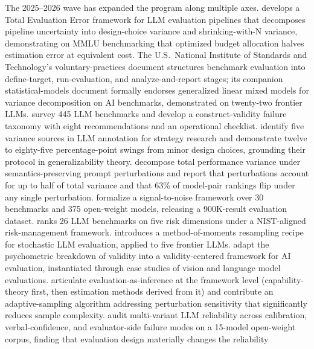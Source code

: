 \documentclass[10pt]{article}
\begin{document}
The 2025--2026 wave has expanded the program along multiple axes.
\citet{messing2026hidden} develops a Total
Evaluation Error framework for LLM evaluation pipelines that
decomposes pipeline uncertainty into design-choice variance and
shrinking-with-N variance, demonstrating on MMLU benchmarking that
optimized budget allocation halves estimation error at equivalent
cost. The U.S.\ National Institute of Standards and Technology's
voluntary-practices document
\citep{nist2026benchmarkpractices} structures benchmark evaluation
into define-target, run-evaluation, and analyze-and-report stages;
its companion statistical-models document \citep{nist2026statmodels}
formally endorses generalized linear mixed models for variance
decomposition on AI benchmarks, demonstrated on twenty-two frontier
LLMs. \citet{bean2025measuring} survey 445 LLM benchmarks and
develop a construct-validity failure taxonomy with eight
recommendations and an operational checklist. \citet{camuffo2026variance}
identify five variance sources in LLM annotation for strategy
research and demonstrate twelve to eighty-five percentage-point
swings from minor design choices, grounding their protocol in
generalizability theory. \citet{romanou2026brittlebench} decompose
total performance variance under semantics-preserving prompt
perturbations and report that perturbations account for up to half
of total variance and that 63\% of model-pair rankings flip under
any single perturbation. \citet{heineman2025signal} formalize a
signal-to-noise framework over 30 benchmarks and 375 open-weight
models, releasing a 900K-result evaluation dataset.
\citet{mcgregor2025benchrisk} ranks 26 LLM benchmarks on five risk
dimensions under a NIST-aligned risk-management framework.
\citet{lior2025reliableeval} introduces a method-of-moments
resampling recipe for stochastic LLM evaluation, applied to five
frontier LLMs. \citet{salaudeen2025measurement} adapt the
psychometric breakdown of validity into a validity-centered
framework for AI evaluation, instantiated through case studies of
vision and language model evaluations.
\citet{jo2025evalinference} articulate evaluation-as-inference at
the framework level (capability-theory first, then estimation
methods derived from it) and contribute an adaptive-sampling
algorithm addressing perturbation sensitivity that significantly
reduces sample complexity. \citet{karmakar2026singleprompt} audit
multi-variant LLM reliability across calibration, verbal-confidence,
and evaluator-side failure modes on a 15-model open-weight corpus,
finding that evaluation design materially changes the reliability
\end{document}
